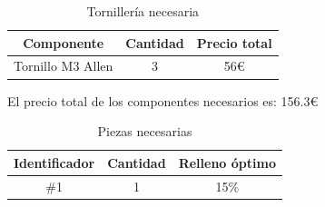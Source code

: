 \begin{table}[H]
\begin{center}
\begin{tabular}{|c|c|c|}
\hline
\textbf{Componente} & \textbf{Cantidad} & \textbf{Precio total} \\
\hline
Tornillo M3 Allen & 3 & 56\euro \\

\hline
\end{tabular}
\caption{Tornillería necesaria}
\label{cuadro:tornilleria}
\end{center}
\end{table}

El precio total de los componentes necesarios es: 156.3\euro
\begin{table}[H]
\begin{center}
\begin{tabular}{|c|c|c|}
\hline
\textbf{Identificador} & \textbf{Cantidad} & \textbf{Relleno óptimo} \\
\hline
\#1 & 1 & 15\% \\
\hline
\end{tabular}
\caption{Piezas necesarias}
\label{cuadro:piezas}
\end{center}
\end{table}
